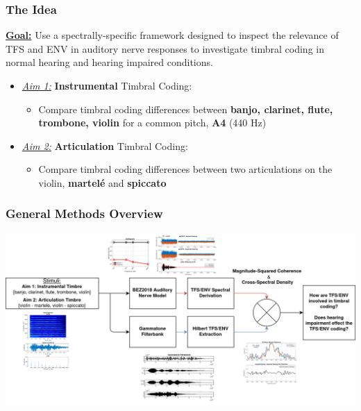 \documentclass[aspectratio=1610]{beamer}
\begin{document}
\begin{frame}
\frametitle{The Idea}

\textbf{\underline{Goal:}} Use a spectrally-specific framework designed to inspect the relevance of TFS and ENV in auditory nerve responses to investigate timbral coding in normal hearing and hearing impaired conditions. \vspace{1em}
\begin{itemize}
\item \textit{\underline{Aim 1:}} \textbf{Instrumental} Timbral Coding:
\begin{itemize}[label = $\blacktriangleright$]
\item Compare timbral coding differences between \textbf{banjo, clarinet, flute, trombone, violin} for a common pitch, \textbf{A4} (440 Hz)
\end{itemize}\vspace{1em}

\item \textit{\underline{Aim 2:}} \textbf{Articulation} Timbral Coding:
\begin{itemize}[label = $\blacktriangleright$]
\item Compare timbral coding differences between two articulations on the violin, \textbf{martel\'{e}} and \textbf{spiccato}
\end{itemize}

\end{itemize}
\end{frame}

\begin{frame}
\frametitle{General Methods Overview}


\centering

\includegraphics[height = .77\textheight]{methods_pics} \vspace{1em} 

\end{frame}
\end{document}
